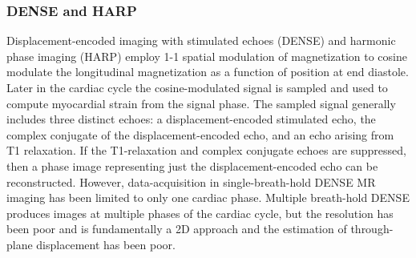 \subsubsection{DENSE and HARP}
Displacement-encoded imaging with stimulated echoes (DENSE) \cite{epstein2004dec} and harmonic phase imaging (HARP) \cite{osman1999cmt} employ 1-1 spatial modulation of magnetization to cosine modulate the longitudinal magnetization as a function of position at end diastole. Later in the cardiac cycle the cosine-modulated signal is sampled and used to compute myocardial strain from the signal phase. The sampled signal generally includes three distinct echoes:  a displacement-encoded stimulated echo, the complex conjugate of the displacement-encoded echo, and an echo arising from T1 relaxation. If the T1-relaxation and complex conjugate echoes are suppressed, then a phase image representing just the displacement-encoded echo can be reconstructed. However, data-acquisition in single-breath-hold DENSE MR imaging has been limited to only one cardiac phase. Multiple breath-hold DENSE produces images at multiple phases of the cardiac cycle, but the resolution has been poor and is fundamentally a 2D approach and the estimation of through-plane displacement has been poor. 


